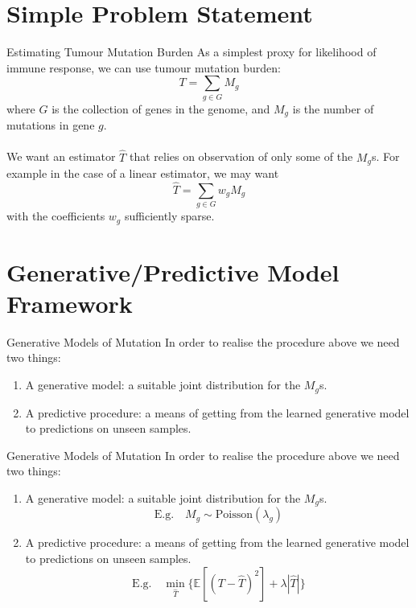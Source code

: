 \documentclass{beamer}
\begin{document}
\section{Simple Problem Statement}

\begin{frame}{Estimating Tumour Mutation Burden}
As a simplest proxy for likelihood of immune response, we can use tumour mutation burden:
\[
T = \sum_{g \in G} M_g
\]
where $G$ is the collection of genes in the genome, and $M_g$ is the number of mutations in gene $g$. \\
~\\
We want an estimator $\hat{T}$ that relies on observation of only some of the $M_g$s. For example in the case of a linear estimator, we may want 
\[\hat{T} = \sum_{g \in G} w_g M_g \]
with the coefficients $w_g$ sufficiently sparse.
\end{frame}
\section{Generative/Predictive Model Framework}
\begin{frame}{Generative Models of Mutation}
In order to realise the procedure above we need two things:
\begin{enumerate}[I]
    \item A generative model: a suitable joint distribution for the $M_g$s. 
    \item A predictive procedure: a means of getting from the learned generative model to predictions on unseen samples.  
\end{enumerate}

\end{frame}

\begin{frame}{Generative Models of Mutation}
In order to realise the procedure above we need two things:
\begin{enumerate}[I]
    \item A generative model: a suitable joint distribution for the $M_g$s. 
    \[\mathrm{E.g.} \quad M_g \sim \mathrm{Poisson}(\lambda_g)\]
    \item A predictive procedure: a means of getting from the learned generative model to predictions on unseen samples.
    \[\mathrm{E.g.} \quad \min_{\hat{T}}\{\mathbb{E}[(T-\hat{T})^2] + \lambda|\hat{T}|\}\]
\end{enumerate}

\end{frame}
\end{document}
